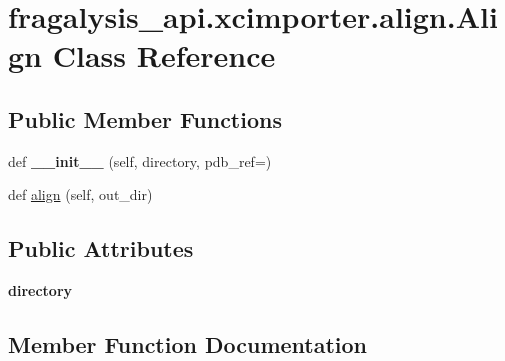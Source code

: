 \hypertarget{classfragalysis__api_1_1xcimporter_1_1align_1_1_align}{}\section{fragalysis\+\_\+api.\+xcimporter.\+align.\+Align Class Reference}
\label{classfragalysis__api_1_1xcimporter_1_1align_1_1_align}
\subsection*{Public Member Functions}
\begin{DoxyCompactItemize}
\item 
\mbox{\label{classfragalysis__api_1_1xcimporter_1_1align_1_1_align_a28e5edc1a05680d36665012eff20a271}} 
def {\bfseries \+\_\+\+\_\+init\+\_\+\+\_\+} (self, directory, pdb\+\_\+ref=\textquotesingle{}\textquotesingle{})
\item 
def \hyperlink{classfragalysis__api_1_1xcimporter_1_1align_1_1_align_a554c8cc5acbc9f5e86bb668c49ea1254}{align} (self, out\+\_\+dir)
\end{DoxyCompactItemize}
\subsection*{Public Attributes}
\begin{DoxyCompactItemize}
\item 
\mbox{\label{classfragalysis__api_1_1xcimporter_1_1align_1_1_align_aaa8ff46caee489ab4cab5279ac946bcc}} 
{\bfseries directory}
\end{DoxyCompactItemize}


\subsection{Member Function Documentation}
\mbox{\label{classfragalysis__api_1_1xcimporter_1_1align_1_1_align_a554c8cc5acbc9f5e86bb668c49ea1254}} 
